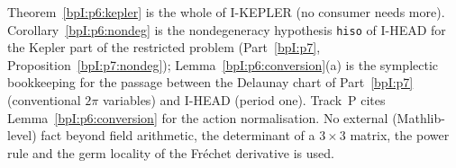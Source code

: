 \begin{remark}\label{bpI:p6:uses}
Theorem~\ref{bpI:p6:kepler} is the whole of I-KEPLER (no consumer needs more). Corollary~\ref{bpI:p6:nondeg} is the nondegeneracy hypothesis \texttt{hiso} of I-HEAD for the Kepler part of the restricted problem (Part~\ref{bpI:p7}, Proposition~\ref{bpI:p7:nondeg}); Lemma~\ref{bpI:p6:conversion}(a) is the symplectic bookkeeping for the passage between the Delaunay chart of Part~\ref{bpI:p7} (conventional $2\pi$ variables) and I-HEAD (period one).
Track~P cites Lemma~\ref{bpI:p6:conversion} for the action normalisation. No external (Mathlib-level) fact beyond field arithmetic, the determinant of a $3\times3$ matrix, the power rule and the germ locality of the Fr\'echet derivative is used.
\end{remark}
